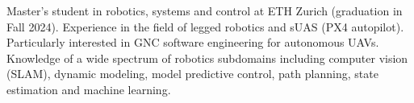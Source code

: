 \vspace{2mm}

\begin{cvparagraph}
    Master's student in robotics, systems and control at ETH Zurich (graduation in Fall 2024). Experience in the field of legged robotics and sUAS (PX4 autopilot). Particularly interested in GNC software engineering for autonomous UAVs. Knowledge of a wide spectrum of robotics subdomains including computer vision (SLAM), dynamic modeling, model predictive control, path planning, state estimation and machine learning.
\end{cvparagraph}
